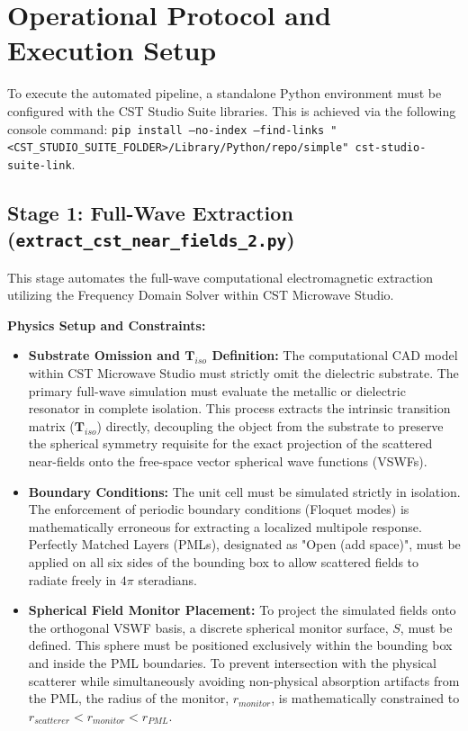 \documentclass[11pt,a4paper]{article}
\begin{document}
\section{Operational Protocol and Execution Setup} \label{sec:protocol}
To execute the automated pipeline, a standalone Python environment must be configured with the CST Studio Suite libraries. This is achieved via the following console command: \texttt{pip install --no-index --find-links "<CST\_STUDIO\_SUITE\_FOLDER>/Library/Python/repo/simple" cst-studio-suite-link}.

\subsection{Stage 1: Full-Wave Extraction (\texttt{extract\_cst\_near\_fields\_2.py})}
This stage automates the full-wave computational electromagnetic extraction utilizing the Frequency Domain Solver within CST Microwave Studio.

\textbf{Physics Setup and Constraints:}
\begin{itemize}
    \item \textbf{Substrate Omission and $\mathbf{T}_{iso}$ Definition:} The computational CAD model within CST Microwave Studio must strictly omit the dielectric substrate. The primary full-wave simulation must evaluate the metallic or dielectric resonator in complete isolation. This process extracts the intrinsic transition matrix ($\mathbf{T}_{iso}$) directly, decoupling the object from the substrate to preserve the spherical symmetry requisite for the exact projection of the scattered near-fields onto the free-space vector spherical wave functions (VSWFs).
    \item \textbf{Boundary Conditions:} The unit cell must be simulated strictly in isolation. The enforcement of periodic boundary conditions (Floquet modes) is mathematically erroneous for extracting a localized multipole response. Perfectly Matched Layers (PMLs), designated as "Open (add space)", must be applied on all six sides of the bounding box to allow scattered fields to radiate freely in $4\pi$ steradians.
    \item \textbf{Spherical Field Monitor Placement:} To project the simulated fields onto the orthogonal VSWF basis, a discrete spherical monitor surface, $S$, must be defined. This sphere must be positioned exclusively within the bounding box and inside the PML boundaries. To prevent intersection with the physical scatterer while simultaneously avoiding non-physical absorption artifacts from the PML, the radius of the monitor, $r_{monitor}$, is mathematically constrained to $r_{scatterer} < r_{monitor} < r_{PML}$.
\end{itemize}
\end{document}
